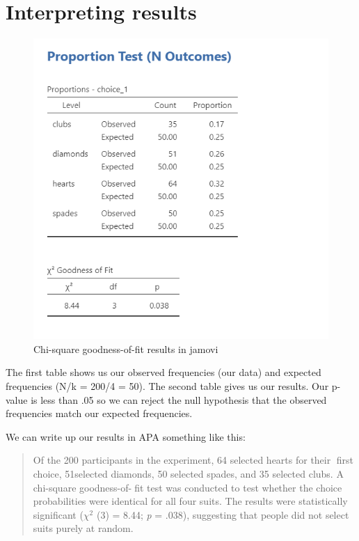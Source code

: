\documentclass[
]{book}
\begin{document}
\hypertarget{interpreting-results-1}{%
\section{Interpreting results}\label{interpreting-results-1}}

\begin{figure}

{\centering \includegraphics[width=1\linewidth]{images/09-chi-square/chi-square_results} 

}

\caption{Chi-square goodness-of-fit results in jamovi}\label{fig:unnamed-chunk-5}
\end{figure}

The first table shows us our observed frequencies (our data) and expected frequencies (N/k = 200/4 = 50). The second table gives us our results. Our p-value is less than .05 so we can reject the null hypothesis that the observed frequencies match our expected frequencies.

We can write up our results in APA something like this:

\begin{quote}
Of the 200 participants in the experiment, 64 selected hearts for their first choice, 51selected diamonds, 50 selected spades, and 35 selected clubs. A chi-square goodness-of-fit test was conducted to test whether the choice probabilities were identical for all four suits. The results were statistically significant (\(\chi^2\) (3) = 8.44; \emph{p} = .038), suggesting that people did not select suits purely at random.
\end{quote}
\end{document}
